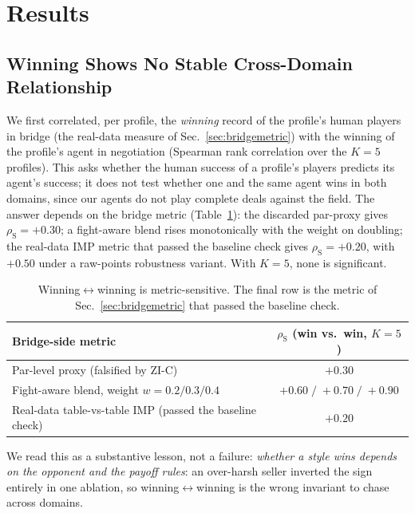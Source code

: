 \documentclass[runningheads]{llncs}
\newcommand{\rhoS}{\rho_{\mathrm{S}}}
\begin{document}
\section{Results}\label{sec:results}

\subsection{Winning Shows No Stable Cross-Domain Relationship}\label{sec:winning}

We first correlated, per profile, the \emph{winning} record of the
profile's human players in bridge (the real-data measure of
Sec.~\ref{sec:bridgemetric}) with the winning of the profile's agent in
negotiation (Spearman rank correlation \cite{spearman1904proof} over
the $K=5$ profiles). This
asks whether the human success of a profile's players predicts its
agent's success; it does not test whether one and the same agent wins
in both domains, since our agents do not play complete deals against
the field. The answer depends on the bridge metric
(Table~\ref{tab:sensitivity}): the discarded par-proxy gives
$\rhoS=+0.30$; a fight-aware blend rises monotonically with the weight
on doubling; the real-data IMP metric that passed the baseline check gives $\rhoS=+0.20$,
with $+0.50$ under a raw-points robustness variant. With
$K=5$, none is significant.

\begin{table}[h]
\centering\small
\caption{Winning$\leftrightarrow$winning is metric-sensitive.
The final row is the metric of Sec.~\ref{sec:bridgemetric} that passed
the baseline check.}
\label{tab:sensitivity}
\begin{tabular}{lc}
\toprule
Bridge-side metric & $\rhoS$ (win vs.\ win, $K=5$)\\
\midrule
Par-level proxy (falsified by ZI-C) & $+0.30$\\
Fight-aware blend, weight $w=0.2 / 0.3 / 0.4$ & $+0.60\; /\; +0.70\; /\; +0.90$\\
Real-data table-vs-table IMP (passed the baseline check) & $\mathbf{+0.20}$\\
\bottomrule
\end{tabular}
\end{table}

We read this as a substantive lesson, not a failure: \emph{whether a
style wins depends on the opponent and the payoff rules}: an over-harsh seller inverted the sign entirely in one ablation, so
winning$\leftrightarrow$winning is the wrong invariant to chase across
domains.
\end{document}
